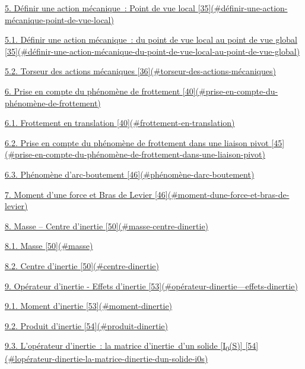 \protect\hyperlink{duxe9finir-une-action-muxe9canique-point-de-vue-local}{5. Définir une action mécanique~: Point de vue local {[}35{]}(\#définir-une-action-mécanique-point-de-vue-local)}

\protect\hyperlink{duxe9finir-une-action-muxe9canique-du-point-de-vue-local-au-point-de-vue-global}{5.1. Définir une action mécanique~: du point de vue local au point de vue global {[}35{]}(\#définir-une-action-mécanique-du-point-de-vue-local-au-point-de-vue-global)}

\protect\hyperlink{torseur-des-actions-muxe9caniques}{5.2. Torseur des actions mécaniques {[}36{]}(\#torseur-des-actions-mécaniques)}

\protect\hyperlink{prise-en-compte-du-phuxe9nomuxe8ne-de-frottement}{6. Prise en compte du phénomène de frottement {[}40{]}(\#prise-en-compte-du-phénomène-de-frottement)}

\protect\hyperlink{frottement-en-translation}{6.1. Frottement en translation {[}40{]}(\#frottement-en-translation)}

\protect\hyperlink{prise-en-compte-du-phuxe9nomuxe8ne-de-frottement-dans-une-liaison-pivot}{6.2. Prise en compte du phénomène de frottement dans une liaison pivot {[}45{]}(\#prise-en-compte-du-phénomène-de-frottement-dans-une-liaison-pivot)}

\protect\hyperlink{phuxe9nomuxe8ne-darc-boutement}{6.3. Phénomène d'arc-boutement {[}46{]}(\#phénomène-darc-boutement)}

\protect\hyperlink{moment-dune-force-et-bras-de-levier}{7. Moment d'une force et Bras de Levier {[}46{]}(\#moment-dune-force-et-bras-de-levier)}

\protect\hyperlink{masse-centre-dinertie}{8. Masse -- Centre d'inertie {[}50{]}(\#masse-centre-dinertie)}

\protect\hyperlink{masse}{8.1. Masse {[}50{]}(\#masse)}

\protect\hyperlink{centre-dinertie}{8.2. Centre d'inertie {[}50{]}(\#centre-dinertie)}

\protect\hyperlink{opuxe9rateur-dinertie---effets-dinertie}{9. Opérateur d'inertie - Effets d'inertie {[}53{]}(\#opérateur-dinertie---effets-dinertie)}

\protect\hyperlink{moment-dinertie}{9.1. Moment d'inertie {[}53{]}(\#moment-dinertie)}

\protect\hyperlink{produit-dinertie}{9.2. Produit d'inertie {[}54{]}(\#produit-dinertie)}

\protect\hyperlink{lopuxe9rateur-dinertie-la-matrice-dinertie-dun-solide-i0s}{9.3. L'opérateur d'inertie~: la matrice d'inertie~d'un solide {[}I\textsubscript{0}(S){]} {[}54{]}(\#lopérateur-dinertie-la-matrice-dinertie-dun-solide-i0s)}


